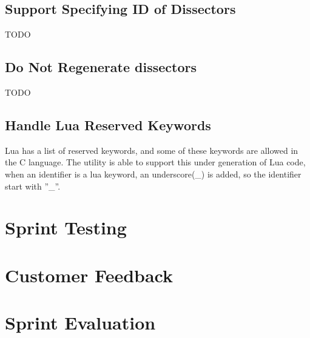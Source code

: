 \subsection{Support Specifying ID of Dissectors}
TODO

\subsection{Do Not Regenerate dissectors}
TODO

\subsection{Handle Lua Reserved Keywords}
Lua has a list of reserved keywords, and some of these keywords are allowed in 
the C language. The utility is able to support this under generation of Lua 
code, when an identifier is a lua keyword, an underscore(\_) is added, so the 
identifier start with ''\_''.

\section{Sprint Testing}


\section{Customer Feedback}


\section{Sprint Evaluation}


